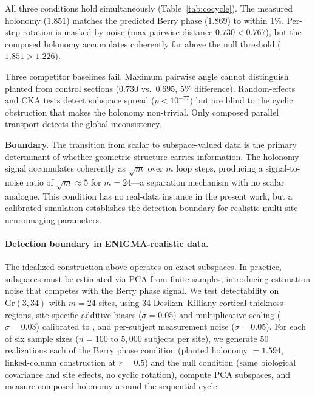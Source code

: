 \documentclass[11pt]{article}
\newcommand{\Gr}{\mathrm{Gr}}
\begin{document}
All three conditions hold simultaneously (Table~\ref{tab:cocycle}).
The measured holonomy ($1.851$) matches the predicted Berry phase ($1.869$) to within 1\%.
Per-step rotation is masked by noise (max pairwise distance $0.730 < 0.767$), but the composed holonomy accumulates coherently far above the null threshold ($1.851 > 1.226$).

Three competitor baselines fail.
Maximum pairwise angle cannot distinguish planted from control sections ($0.730$ vs.\ $0.695$, 5\% difference).
Random-effects and CKA tests detect subspace spread ($p < 10^{-77}$) but are blind to the cyclic obstruction that makes the holonomy non-trivial.
Only composed parallel transport detects the global inconsistency.

\textbf{Boundary.} The transition from scalar to subspace-valued data is the primary determinant of whether geometric structure carries information.
The holonomy signal accumulates coherently as $\sqrt{m}$ over $m$ loop steps, producing a signal-to-noise ratio of $\sqrt{m} \approx 5$ for $m = 24$---a separation mechanism with no scalar analogue.
This condition has no real-data instance in the present work, but a calibrated simulation establishes the detection boundary for realistic multi-site neuroimaging parameters.

\paragraph{Detection boundary in ENIGMA-realistic data.}
The idealized construction above operates on exact subspaces.
In practice, subspaces must be estimated via PCA from finite samples, introducing estimation noise that competes with the Berry phase signal.
We test detectability on $\Gr(3, 34)$ with $m = 24$ sites, using 34 Desikan--Killiany cortical thickness regions, site-specific additive biases ($\sigma = 0.05$) and multiplicative scaling ($\sigma = 0.03$) calibrated to \citet{fortin2018harmonization}, and per-subject measurement noise ($\sigma = 0.05$).
For each of six sample sizes ($n = 100$ to $5{,}000$ subjects per site), we generate 50 realizations each of the Berry phase condition (planted holonomy $= 1.594$, linked-column construction at $r = 0.5$) and the null condition (same biological covariance and site effects, no cyclic rotation), compute PCA subspaces, and measure composed holonomy around the sequential cycle.
\end{document}
